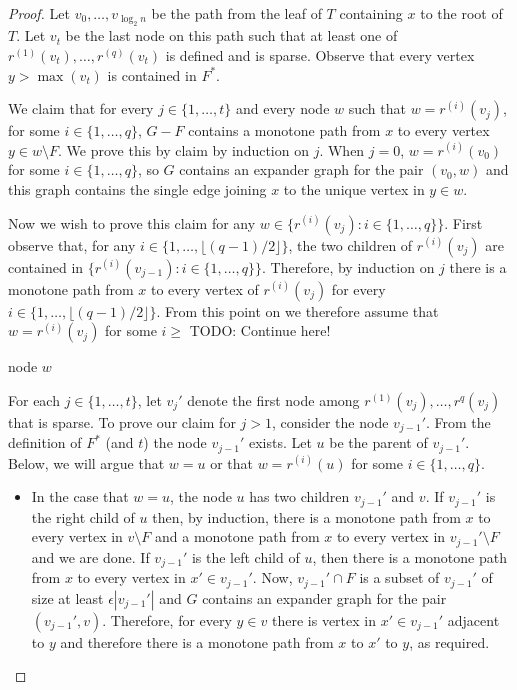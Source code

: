 \documentclass{patmorin}
\begin{document}
\begin{proof}
  Let $v_0,\ldots,v_{\log_2 n}$ be the path from the leaf of $T$
  containing $x$ to the root of $T$.  Let $v_t$ be the last node on
  this path such that at least one of $r^{(1)}(v_t),\ldots,r^{(q)}(v_t)$
  is defined and is sparse.  Observe that every vertex $y > \max(v_t)$
  is contained in $F^*$.

  We claim that for every $j\in\{1,\ldots,t\}$ and every node $w$ such
  that $w=r^{(i)}(v_j)$, for some $i\in\{1,\ldots,q\}$, $G-F$ contains a
  monotone path from $x$ to every vertex $y\in w\setminus F$.  We prove
  this by claim by induction on $j$.  When $j=0$, $w = r^{(i)}(v_0)$
  for some $i\in\{1,\ldots,q\}$, so $G$ contains an expander graph for
  the pair $(v_0,w)$ and this graph contains the single edge joining $x$
  to the unique vertex in $y\in w$.

  Now we wish to prove this claim for any $w\in\{r^{(i)}(v_j): i\in\{1,\ldots,q\}\}$.  First observe that, for any $i\in\{1,\ldots,\lfloor(q-1)/2\rfloor\}$, the two children of $r^{(i)}(v_j)$ are contained in 
	$\{r^{(i)}(v_{j-1}): i\in\{1,\ldots,q\}\}$. Therefore, by induction on $j$ there is a monotone path from $x$ to every vertex of $r^{(i)}(v_j)$ for every $i\in\{1,\ldots,\lfloor (q-1)/2\rfloor\}$. From this point on we therefore assume that $w=r^{(i)}(v_j)$ for some $i \ge $ TODO: Continue here!
	
	node $w$


  For each $j\in\{1,\ldots,t\}$, let $v_j'$ denote the first node among
  $r^{(1)}(v_j),\ldots,r^{q}(v_j)$ that is sparse.  To prove our claim
  for $j>1$, consider the node $v_{j-1}'$.  From the definition of $F^*$
  (and $t$) the node $v_{j-1}'$ exists.  Let $u$ be the parent
  of $v_{j-1}'$.
  Below, we will argue
  that $w=u$ or that $w=r^{(i)}(u)$ for some $i\in\{1,\ldots,q\}$.
  \begin{itemize}
    \item In the case that $w=u$, the node $u$ has two children $v_{j-1}'$
    and $v$.  If $v_{j-1}'$ is the right child of $u$ then, by induction,
    there is a monotone path from $x$ to every vertex in $v\setminus F$
    and a monotone path from $x$ to every vertex in $v_{j-1}'\setminus F$
    and we are done.  If $v_{j-1}'$ is the left child of $u$, then there
    is a monotone path from $x$ to every vertex in $x'\in v_{j-1}'$.
    Now, $v_{j-1}'\cap F$ is a subset of $v_{j-1}'$ of size at least
    $\epsilon |v_{j-1}'|$ and $G$ contains an expander graph for the
    pair $(v_{j-1}',v)$.	Therefore, for every $y\in v$ there is
    vertex in $x'\in v_{j-1}'$ adjacent to $y$ and therefore there is
    a monotone path from $x$ to $x'$ to $y$, as required.


\end{itemize}
\end{proof}
\end{document}
